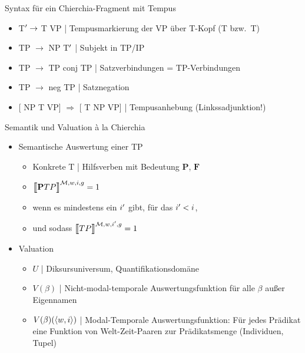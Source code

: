 \begin{frame}
  {Syntax für ein Chierchia-Fragment mit Tempus}
  \onslide<+->
  \begin{itemize}[<+->]
    \item \alert{T$^{\prime} \rightarrow$ T VP} | Tempusmarkierung der VP über T-Kopf (T bzw.\ T)
    \item TP $\rightarrow$ NP T$^{\prime}$ | Subjekt in TP\slash IP
    \item TP $\rightarrow$ TP conj TP | Satzverbindungen = TP-Verbindungen
    \item TP $\rightarrow$ neg TP | Satznegation
    \item \alert{[ NP T VP] $\Rightarrow$ [ T NP VP]} | Tempusanhebung (Linkssadjunktion!)
  \end{itemize}
\end{frame}

\begin{frame}
  {Semantik und Valuation à la Chierchia}
  \onslide<+->
  \begin{itemize}[<+->]
    \item Semantische Auswertung einer TP
      \Halbzeile
      \begin{itemize}[<+->]
        \item Konkrete T | Hilfsverben mit Bedeutung $\mathbf{P}$, $\mathbf{F}$
        \item $\DEMM{\mathbf{P} TP} =1$
        \item wenn es mindestens ein $i^{\prime}$ gibt, für das $i^{\prime}<i$,
        \item und sodass $\Dem{TP}{\mMm,w,i\Prm,g}=1$
      \end{itemize}
      \Zeile
    \item Valuation
      \Halbzeile
      \begin{itemize}[<+->]
        \item \alert{$U$} | Diksursuniversum, Quantifikationsdomäne
        \item \alert{$V(\beta)$} | Nicht-modal-temporale Auswertungsfunktion für alle $\beta$ außer Eigennamen
        \item \alert{$V(\beta)({\langle{}w,i\rangle})$} | Modal-Temporale Auswertungsfunktion: Für jedes Prädikat eine Funktion von Welt-Zeit-Paaren zur Prädikatsmenge (Individuen, Tupel)
      \end{itemize}
  \end{itemize}
\end{frame}


